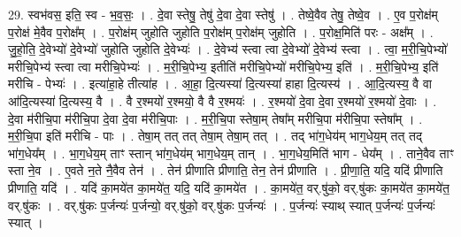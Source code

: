 \documentclass[17pt]{extarticle}
\begin{document}
29. स्वभ॑वस॒ इति॒ स्व - भ॒व॒सः॒ । . दे॒वा स्तेषु॒ तेषु॑ दे॒वा दे॒वा स्तेषु॑ । . तेष्वे॒वैव तेषु॒ तेष्वे॒व । . ए॒व प॒रोक्ष॑म् प॒रोक्ष॑ मे॒वैव प॒रोक्ष᳚म् । . प॒रोक्ष॑म् जुहोति जुहोति प॒रोक्ष॑म् प॒रोक्ष॑म् जुहोति । . प॒रोक्ष॒मिति॑ परः - अक्ष᳚म् । . जु॒हो॒ति॒ दे॒वेभ्यो॑ दे॒वेभ्यो॑ जुहोति जुहोति दे॒वेभ्यः॑ । . दे॒वेभ्य॑ स्त्वा त्वा दे॒वेभ्यो॑ दे॒वेभ्य॑ स्त्वा । . त्वा॒ म॒री॒चि॒पेभ्यो॑ मरीचि॒पेभ्य॑ स्त्वा त्वा मरीचि॒पेभ्यः॑ । . म॒री॒चि॒पेभ्य॒ इतीति॑ मरीचि॒पेभ्यो॑ मरीचि॒पेभ्य॒ इति॑ । . म॒री॒चि॒पेभ्य॒ इति॑ मरीचि - पेभ्यः॑ । . इत्या॑हा॒हे तीत्या॑ह । . आ॒हा॒ दि॒त्यस्या॑ दि॒त्यस्या॑ हाहा दि॒त्यस्य॑ । . आ॒दि॒त्यस्य॒ वै वा आ॑दि॒त्यस्या॑ दि॒त्यस्य॒ वै । . वै र॒श्मयो॑ र॒श्मयो॒ वै वै र॒श्मयः॑ । . र॒श्मयो॑ दे॒वा दे॒वा र॒श्मयो॑ र॒श्मयो॑ दे॒वाः । . दे॒वा म॑रीचि॒पा म॑रीचि॒पा दे॒वा दे॒वा म॑रीचि॒पाः । . म॒री॒चि॒पा स्तेषा॒म् तेषा᳚म् मरीचि॒पा म॑रीचि॒पा स्तेषा᳚म् । . म॒री॒चि॒पा इति॑ मरीचि - पाः । . तेषा॒म् तत् तत् तेषा॒म् तेषा॒म् तत् । . तद् भा॑ग॒धेय॑म् भाग॒धेय॒म् तत् तद् भा॑ग॒धेय᳚म् । . भा॒ग॒धेय॒म् ताꣳ स्तान् भा॑ग॒धेय॑म् भाग॒धेय॒म् तान् । . भा॒ग॒धेय॒मिति॑ भाग - धेय᳚म् । . ताने॒वैव ताꣳ स्ता ने॒व । . ए॒वते न॒ते नै॒वैव तेन॑ । . तेन॑ प्रीणाति प्रीणाति॒ तेन॒ तेन॑ प्रीणाति । . प्री॒णा॒ति॒ यदि॒ यदि॑ प्रीणाति प्रीणाति॒ यदि॑ । . यदि॑ का॒मये॑त का॒मये॑त॒ यदि॒ यदि॑ का॒मये॑त । . का॒मये॑त॒ वर्.षु॑को॒ वर्.षु॑कः का॒मये॑त का॒मये॑त॒ वर्.षु॑कः । . वर्.षु॑कः प॒र्जन्यः॑ प॒र्जन्यो॒ वर्.षु॑को॒ वर्.षु॑कः प॒र्जन्यः॑ । . प॒र्जन्यः॑ स्याथ् स्यात् प॒र्जन्यः॑ प॒र्जन्यः॑ स्यात् । \newline
\end{document}
